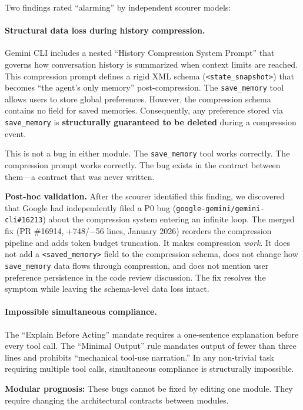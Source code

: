 \documentclass[11pt,a4paper]{article}
\begin{document}
Two findings rated ``alarming'' by independent scourer models:

\paragraph{Structural data loss during history compression.} Gemini CLI
includes a nested ``History Compression System Prompt'' that governs
how conversation history is summarized when context limits are reached.
This compression prompt defines a rigid XML schema
(\texttt{<state\_snapshot>}) that becomes ``the agent's only memory''
post-compression. The \texttt{save\_memory} tool allows users to store
global preferences. However, the compression schema contains no field
for saved memories. Consequently, any preference stored via
\texttt{save\_memory} is \textbf{structurally guaranteed to be deleted}
during a compression event.

This is not a bug in either module. The \texttt{save\_memory} tool
works correctly. The compression prompt works correctly. The bug exists
in the contract between them---a contract that was never written.

\textbf{Post-hoc validation.} After the scourer identified this
finding, we discovered that Google had independently filed a P0 bug
(\texttt{google-gemini/gemini-cli\#16213}) about the compression system
entering an infinite loop. The merged fix (PR \#16914, +748/$-$56
lines, January 2026) reorders the compression pipeline and adds token
budget truncation. It makes compression \emph{work}. It does not add a
\texttt{<saved\_memory>} field to the compression schema, does not
change how \texttt{save\_memory} data flows through compression, and
does not mention user preference persistence in the code review
discussion. The fix resolves the symptom while leaving the schema-level
data loss intact.

\paragraph{Impossible simultaneous compliance.} The ``Explain Before
Acting'' mandate requires a one-sentence explanation before every tool
call. The ``Minimal Output'' rule mandates output of fewer than three
lines and prohibits ``mechanical tool-use narration.'' In any
non-trivial task requiring multiple tool calls, simultaneous compliance
is structurally impossible.

\textbf{Modular prognosis:} These bugs cannot be fixed by editing one
module. They require changing the architectural contracts between
modules.
\end{document}
